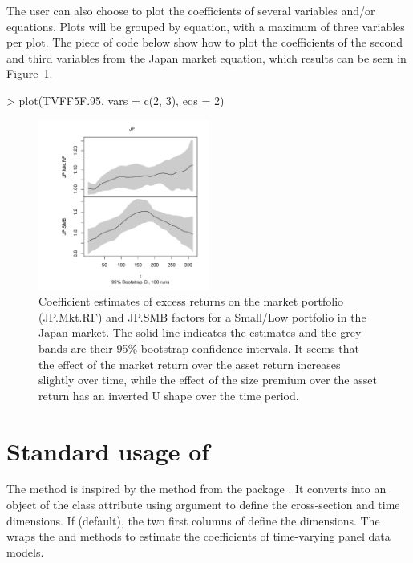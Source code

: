 The user can also choose to plot the coefficients of several variables and/or equations. Plots will be grouped by equation, with a maximum of three variables per plot. The piece of code below show how to plot the coefficients of the second and third variables from the Japan market equation, which results can be seen in Figure~\ref{fig:tvff5f2}.
\begin{Schunk}
\begin{Sinput}
> plot(TVFF5F.95, vars = c(2, 3), eqs = 2)
\end{Sinput}
\end{Schunk}

\begin{figure}[!ht]
\centering
\includegraphics[width = 0.5\textwidth]{Fig2}
\caption{Coefficient estimates of excess returns on the market portfolio (JP.Mkt.RF) and JP.SMB factors for a Small/Low portfolio in the Japan market. The solid line indicates the estimates and the grey bands are their 95\% bootstrap confidence intervals. It seems that the effect of the market return over the asset return increases slightly over time, while the effect of the size premium over the asset return has an inverted U shape over the time period. \label{fig:tvff5f2}}
\end{figure}


\section{Standard usage of }
\label{ssec:tvplm}

The  method is inspired by the  method from the package . It converts  into an object of the class attribute  using argument  to define the cross-section and time dimensions. If  (default), the two first columns of  define the dimensions. The  wraps the  and  methods to estimate the coefficients of time-varying panel data models.

